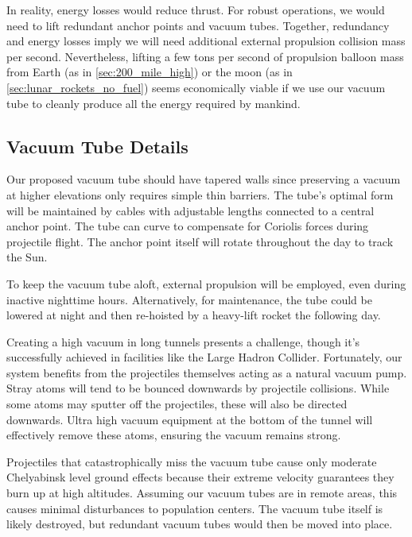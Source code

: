 \documentclass{article}
\begin{document}
In reality, energy losses would reduce thrust.   For robust operations, we would need to lift redundant anchor points and vacuum tubes.  Together, redundancy and energy losses imply we will need additional external propulsion collision mass per second.  Nevertheless, lifting a few tons per second of propulsion balloon mass from Earth (as in \autoref{sec:200_mile_high}) or the moon (as in \autoref{sec:lunar_rockets_no_fuel}) seems economically viable if we use our vacuum tube to cleanly produce all the energy required by mankind. 

\subsection{Vacuum Tube Details}
Our proposed vacuum tube should have tapered walls since preserving a vacuum at higher elevations only requires simple thin barriers. The tube's optimal form will be maintained by cables with adjustable lengths connected to a central anchor point. The tube can curve to compensate for Coriolis forces during projectile flight. The anchor point itself will rotate throughout the day to track the Sun.

To keep the vacuum tube aloft, external propulsion will be employed, even during inactive nighttime hours. Alternatively, for maintenance, the tube could be lowered at night and then re-hoisted by a heavy-lift rocket the following day.

Creating a high vacuum in long tunnels presents a challenge, though it's successfully achieved in facilities like the Large Hadron Collider. Fortunately, our system benefits from the projectiles themselves acting as a natural vacuum pump. Stray atoms will tend to be bounced downwards by  projectile collisions. While some atoms may sputter off the projectiles, these will also be directed downwards. Ultra high vacuum equipment at the bottom of the tunnel will effectively remove these atoms, ensuring the vacuum remains strong.

Projectiles that catastrophically miss the vacuum tube cause only moderate Chelyabinsk level \cite{popova2021chelyabinsk} ground effects because their extreme velocity guarantees they burn up at high altitudes.   Assuming our vacuum tubes are in remote areas, this causes minimal disturbances to population centers.   The vacuum tube itself is likely destroyed, but redundant vacuum tubes would then be moved into place.
\end{document}
